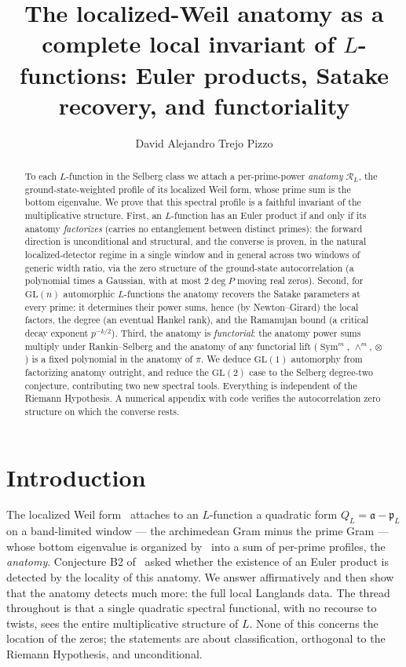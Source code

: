 \documentclass[11pt]{amsart}
\title[The Anatomy as a Local Invariant]{The localized-Weil anatomy as a complete local invariant of
$L$-functions: Euler products, Satake recovery, and functoriality}
\author{David Alejandro Trejo Pizzo}
\theoremstyle{definition}
\theoremstyle{remark}
\newcommand{\fa}{\mathfrak a}
\newcommand{\fp}{\mathfrak p}
\newcommand{\cR}{\mathcal R}
\newcommand{\GL}{\mathrm{GL}}
\DeclareMathOperator{\Sym}{Sym}
\begin{document}
\nocite{bgCarleson,bgGarnett,bgRSar,bgYoung}
\begin{abstract}
To each $L$-function in the Selberg class we attach a per-prime-power
\emph{anatomy} $\cR_L$, the ground-state-weighted profile of its localized Weil
form, whose prime sum is the bottom eigenvalue. We prove that this spectral
profile is a faithful invariant of the multiplicative structure. First, an
$L$-function has an Euler product if and only if its anatomy \emph{factorizes}
(carries no entanglement between distinct primes): the forward direction is
unconditional and structural, and the converse is proven, in the natural
localized-detector regime in a single window and in general across two windows
of generic width ratio, via the zero structure of the ground-state
autocorrelation (a polynomial times a Gaussian, with at most $2\deg P$ moving
real zeros). Second, for $\GL(n)$ automorphic $L$-functions the anatomy recovers
the Satake parameters at every prime: it determines their power sums, hence (by
Newton--Girard) the local factors, the degree (an eventual Hankel rank), and the
Ramanujan bound (a critical decay exponent $p^{-k/2}$). Third, the anatomy is
\emph{functorial}: the anatomy power sums multiply under Rankin--Selberg and the
anatomy of any functorial lift ($\Sym^m$, $\wedge^m$, $\otimes$) is a fixed
polynomial in the anatomy of $\pi$. We deduce $\GL(1)$ automorphy from
factorizing anatomy outright, and reduce the $\GL(2)$ case to the Selberg
degree-two conjecture, contributing two new spectral tools. Everything is
independent of the Riemann Hypothesis. A numerical appendix with code verifies
the autocorrelation zero structure on which the converse rests.
\end{abstract}
\maketitle

\tableofcontents
\newpage

\section{Introduction}
The localized Weil form~\cite{RP7} attaches to an $L$-function a quadratic form
$Q_L=\fa-\fp_L$ on a band-limited window --- the archimedean Gram minus the
prime Gram --- whose bottom eigenvalue is organized by~ into a sum of
per-prime profiles, the \emph{anatomy}. Conjecture B2 of~ asked
whether the existence of an Euler product is detected by the locality of this
anatomy. We answer affirmatively and then show that the anatomy detects much
more: the full local Langlands data. The thread throughout is that a single
quadratic spectral functional, with no recourse to twists, sees the entire
multiplicative structure of $L$. None of this concerns the location of the
zeros; the statements are about classification, orthogonal to the Riemann
Hypothesis, and unconditional.
\end{document}
